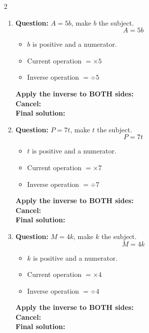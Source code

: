\documentclass[11pt]{article}
\begin{document}
\begin{multicols}{2}
\begin{enumerate}[leftmargin=*, itemsep=10pt]
\item \textbf{Question:} \( A = 5b \), make \( b \) the subject.
\[
A=5b
\]
\begin{itemize}[leftmargin=*, itemsep=2pt]
\item \(b\) is positive and a numerator.
\item Current operation \(= \times 5\)
\item Inverse operation \(= \div 5\)
\end{itemize}
\textbf{Apply the inverse to BOTH sides:} \\[1.5cm]
\textbf{Cancel:} \\[1.5cm]
\textbf{Final solution:}\\[1.5cm]

\newpage
\item \textbf{Question:} \( P = 7t \), make \( t \) the subject.
\[
P=7t
\]
\begin{itemize}[leftmargin=*, itemsep=2pt]
\item \(t\) is positive and a numerator.
\item Current operation \(= \times 7\)
\item Inverse operation \(= \div 7\)
\end{itemize}
\textbf{Apply the inverse to BOTH sides:} \\[1.5cm]
\textbf{Cancel:} \\[1.5cm]
\textbf{Final solution:}\\[1.5cm]

\item \textbf{Question:} \( M = 4k \), make \( k \) the subject.
\[
M=4k
\]
\begin{itemize}[leftmargin=*, itemsep=2pt]
\item \(k\) is positive and a numerator.
\item Current operation \(= \times 4\)
\item Inverse operation \(= \div 4\)
\end{itemize}
\textbf{Apply the inverse to BOTH sides:} \\[1.5cm]
\textbf{Cancel:} \\[1.5cm]
\textbf{Final solution:}\\[1.5cm]


\end{enumerate}
\end{multicols}
\end{document}
